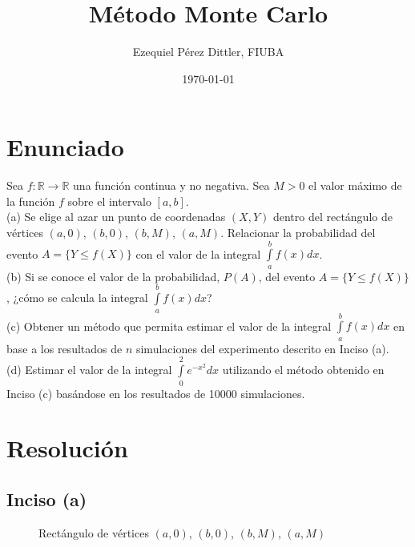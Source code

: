 \documentclass[a4paper]{article}
\begin{document}
\title{Método Monte Carlo}
\date{\today}
\author{Ezequiel Pérez Dittler, FIUBA}

\maketitle
\newpage

\section{Enunciado}
Sea $f: \mathbb{R} \to \mathbb{R}$ una función continua y no negativa.
Sea $M > 0$ el valor máximo de la función $f$ sobre el intervalo $[a, b]$. \\

(a) Se elige al azar un punto de coordenadas $(X, Y)$ dentro del rectángulo de
vértices $(a, 0)$, $(b, 0)$, $(b, M)$, $(a, M)$. Relacionar la probabilidad
del evento $A = \{ Y \leqslant f(X) \}$ con el valor de la integral
$\int\limits_a^b f(x) dx$. \\

(b) Si se conoce el valor de la probabilidad, $P(A)$, del evento
$A = \{ Y \leqslant f(X) \}$, ¿cómo se calcula la integral
$\int\limits_a^b f(x) dx$? \\

(c) Obtener un método que permita estimar el valor de la integral
$\int\limits_a^b f(x) dx$ en base a los resultados de $n$ simulaciones del
experimento descrito en Inciso (a). \\

(d) Estimar el valor de la integral $\int\limits_0^2 e^{-x^{2}} dx$ utilizando
el método obtenido en Inciso (c) basándose en los resultados de 10000
simulaciones.

\section{Resolución}
\subsection{Inciso (a)}
\begin{figure}[h]
  \centering
  \pgfplotsset{compat=1.3}
  \caption{Rectángulo de vértices $(a, 0)$, $(b, 0)$, $(b, M)$, $(a, M)$}
\end{figure}
\end{document}
